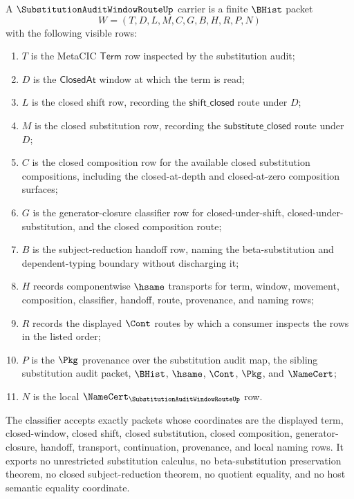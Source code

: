 \begin{definition}
\label{def:substitution-audit-window-route-carrier}
A $\SubstitutionAuditWindowRouteUp$ carrier is a finite $\BHist$ packet
$$
W=(T,D,L,M,C,G,B,H,R,P,N)
$$
with the following visible rows:
\begin{enumerate}
\item $T$ is the MetaCIC $\mathsf{Term}$ row inspected by the substitution audit;
\item $D$ is the $\mathsf{ClosedAt}$ window at which the term is read;
\item $L$ is the closed shift row, recording the $\mathsf{shift\_closed}$ route under $D$;
\item $M$ is the closed substitution row, recording the $\mathsf{substitute\_closed}$ route under $D$;
\item $C$ is the closed composition row for the available closed substitution compositions, including the closed-at-depth and closed-at-zero composition surfaces;
\item $G$ is the generator-closure classifier row for closed-under-shift, closed-under-substitution, and the closed composition route;
\item $B$ is the subject-reduction handoff row, naming the beta-substitution and dependent-typing boundary without discharging it;
\item $H$ records componentwise $\hsame$ transports for term, window, movement, composition, classifier, handoff, route, provenance, and naming rows;
\item $R$ records the displayed $\Cont$ routes by which a consumer inspects the rows in the listed order;
\item $P$ is the $\Pkg$ provenance over the substitution audit map, the sibling substitution audit packet, $\BHist$, $\hsame$, $\Cont$, $\Pkg$, and $\NameCert$;
\item $N$ is the local $\NameCert_{\SubstitutionAuditWindowRouteUp}$ row.
\end{enumerate}
The classifier accepts exactly packets whose coordinates are the displayed term, closed-window, closed shift, closed substitution, closed composition, generator-closure, handoff, transport, continuation, provenance, and local naming rows. It exports no unrestricted substitution calculus, no beta-substitution preservation theorem, no closed subject-reduction theorem, no quotient equality, and no host semantic equality coordinate.
\end{definition}

